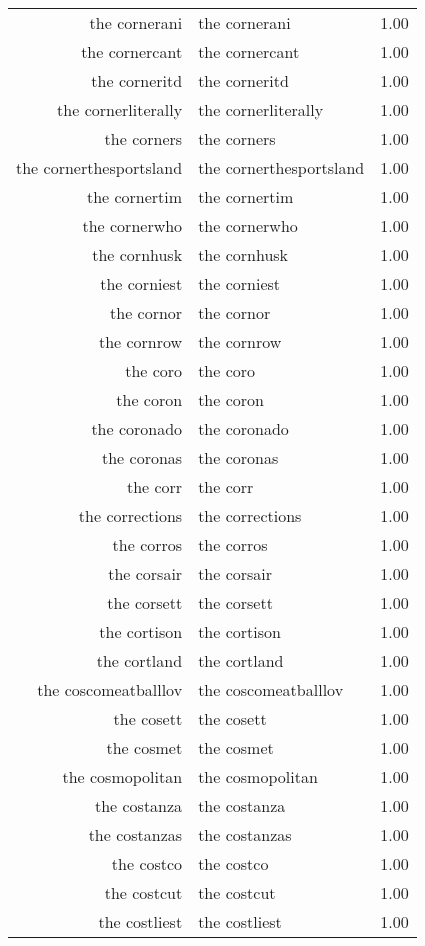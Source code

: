\begin{table}[ht]
\begin{tabular}{rlr}
  the cornerani & the cornerani & 1.00 \\ 
  the cornercant & the cornercant & 1.00 \\ 
  the corneritd & the corneritd & 1.00 \\ 
  the cornerliterally & the cornerliterally & 1.00 \\ 
  the corners & the corners & 1.00 \\ 
  the cornerthesportsland & the cornerthesportsland & 1.00 \\ 
  the cornertim & the cornertim & 1.00 \\ 
  the cornerwho & the cornerwho & 1.00 \\ 
  the cornhusk & the cornhusk & 1.00 \\ 
  the corniest & the corniest & 1.00 \\ 
  the cornor & the cornor & 1.00 \\ 
  the cornrow & the cornrow & 1.00 \\ 
  the coro & the coro & 1.00 \\ 
  the coron & the coron & 1.00 \\ 
  the coronado & the coronado & 1.00 \\ 
  the coronas & the coronas & 1.00 \\ 
  the corr & the corr & 1.00 \\ 
  the corrections & the corrections & 1.00 \\ 
  the corros & the corros & 1.00 \\ 
  the corsair & the corsair & 1.00 \\ 
  the corsett & the corsett & 1.00 \\ 
  the cortison & the cortison & 1.00 \\ 
  the cortland & the cortland & 1.00 \\ 
  the coscomeatballlov & the coscomeatballlov & 1.00 \\ 
  the cosett & the cosett & 1.00 \\ 
  the cosmet & the cosmet & 1.00 \\ 
  the cosmopolitan & the cosmopolitan & 1.00 \\ 
  the costanza & the costanza & 1.00 \\ 
  the costanzas & the costanzas & 1.00 \\ 
  the costco & the costco & 1.00 \\ 
  the costcut & the costcut & 1.00 \\ 
  the costliest & the costliest & 1.00 \\ 

\end{tabular}
\end{table}
